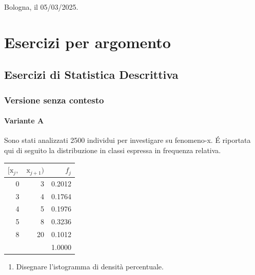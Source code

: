 \documentclass[
  11pt,
]{book}
\providecommand{\tightlist}{%
  \setlength{\itemsep}{0pt}\setlength{\parskip}{0pt}}
\theoremstyle{mytheoremstyle}
\theoremstyle{mydefstyle}
\begin{document}
Bologna, il 05/03/2025.

\part{Esercizi per argomento}

\chapter{Esercizi di Statistica Descrittiva}\label{esercizi-di-statistica-descrittiva}

\section{Versione senza contesto}\label{versione-senza-contesto}

\subsection{Variante A}\label{variante-a}

Sono stati analizzati 2500 individui per investigare su fenomeno-x. É riportata qui di seguito la distribuzione in classi espressa in frequenza relativa.

\begin{tabular}{rrr}
\toprule
$[\text{x}_j,$ & $\text{x}_{j+1})$ & $f_j$\\
\midrule
0 & 3 & 0.2012\\
3 & 4 & 0.1764\\
4 & 5 & 0.1976\\
5 & 8 & 0.3236\\
8 & 20 & 0.1012\\
 &  & 1.0000\\
\bottomrule
\end{tabular}

\begin{enumerate}
\def\labelenumi{\alph{enumi}.}
\tightlist
\item
  Disegnare l'istogramma di densità percentuale.
\end{enumerate}
\end{document}
